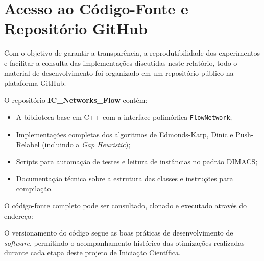 \documentclass[12pt,a4paper]{article}
\begin{document}
\newpage
\section{Acesso ao Código-Fonte e Repositório GitHub}
\label{ap:github}

Com o objetivo de garantir a transparência, a reprodutibilidade dos experimentos e facilitar a consulta das implementações discutidas neste relatório, todo o material de desenvolvimento foi organizado em um repositório público na plataforma GitHub.

O repositório \textbf{IC\_Networks\_Flow} contém:
\begin{itemize}
    \item A biblioteca base em C++ com a interface polimórfica \lstinline{FlowNetwork};
    \item Implementações completas dos algoritmos de Edmonds-Karp, Dinic e Push-Relabel (incluindo a \textit{Gap Heuristic});
    \item Scripts para automação de testes e leitura de instâncias no padrão DIMACS;
    \item Documentação técnica sobre a estrutura das classes e instruções para compilação.
\end{itemize}

O código-fonte completo pode ser consultado, clonado e executado através do endereço:

\vspace{0.4cm}
\begin{center}
\end{center}
\vspace{0.4cm}

O versionamento do código segue as boas práticas de desenvolvimento de \textit{software}, permitindo o acompanhamento histórico das otimizações realizadas durante cada etapa deste projeto de Iniciação Científica.
\end{document}
